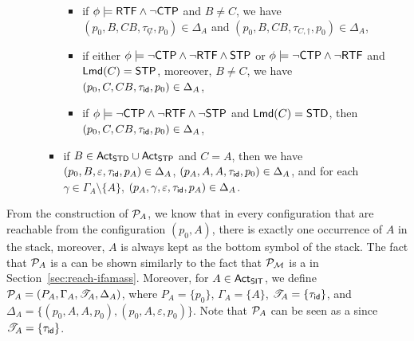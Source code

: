 \begin{itemize}
\begin{itemize}
\begin{itemize}
\begin{itemize}
\begin{itemize}
				\end{itemize}
%
				\item if $\phi \models {\sf RTF} \wedge \neg{\sf CTP}$ and $B\neq C$,  
                we have $(p_0, B, CB, \tau_{\not C}, p_0) \in \Delta_{A}$ 
                and $(p_0, B, CB, \tau_{C, \dag}, p_0) \in \Delta_{A}$,
%
				\item if either $\phi \models \neg{\sf CTP} \wedge \neg {\sf RTF} \wedge {\sf STP}$ or $\phi \models \neg{\sf CTP} \wedge \neg {\sf RTF}$ and ${\sf Lmd}(C) = {\sf STP}$, moreover, $B \neq C$, we have $(p_0, C, CB, \tau_{\mathsf{id}}, p_0) \in \Delta_{A}$, 
				\item if $\phi \models \neg{\sf CTP} \wedge \neg {\sf RTF} \wedge \neg {\sf STP}$ and ${\sf Lmd}(C) = {\sf STD}$, then $(p_0, C, CB, \tau_{\mathsf{id}}, p_0) \in \Delta_{A}$,
				\end{itemize}
				
				\item if $B \in {\sf Act}_{\sf STD} \cup {\sf Act}_{\sf STP}$ and $C = A$,  then we have $(p_0, B, \varepsilon, \tau_{\mathsf{id}}, p_A) \in \Delta_{A}$, $(p_A, A, A, \tau_{\mathsf{id}}, p_0)  \in \Delta_{A}$, and for each $\gamma \in \Gamma_A \setminus \{A\}$, $(p_A, \gamma, \varepsilon, \tau_{\mathsf{id}}, p_A) \in \Delta_{A}$. 
            \end{itemize}
        \end{itemize}
\end{itemize}
From the construction of ${\mathcal{P} }_A$, we know that in every configuration that are reachable from the configuration $(p_0, A)$, there is exactly one occurrence of $A$ in the stack, moreover,  $A$ is always kept as the bottom symbol of the stack. 
The fact that ${\mathcal{P} }_{A}$ is a {\WOTrPDS} can be shown similarly to the fact that ${\mathcal{P} }_{\mathcal{M} }$ is a {\WOTrPDS} in Section~\ref{sec:reach-ifamass}.
Moreover, for $A \in {\sf Act}_{\sf SIT}$, we define ${\mathcal{P} }_A = (P_A, \Gamma_A, {\mathscr{T} }_A, \Delta_A)$, where $P_A = \{p_0\}$, $\Gamma_A = \{A\}$, ${\mathscr{T} }_A = \{\tau_{\mathsf{id}}\}$, and $\Delta_A = \{(p_0, A, A, p_0), (p_0, A, \varepsilon, p_0)\}$. Note that ${\mathcal{P} }_A$ can be seen as a {\PDS} since ${\mathscr{T} }_A = \{\tau_{\mathsf{id}}\}$.


